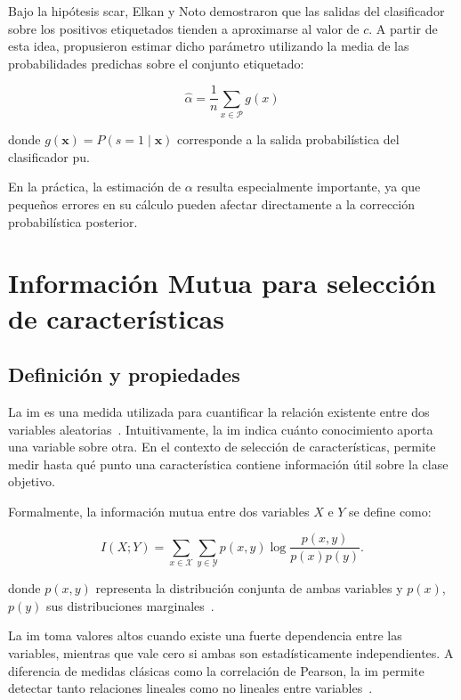 Bajo la hipótesis \acrshort{scar}, Elkan y Noto demostraron que las salidas del clasificador sobre los positivos etiquetados tienden a aproximarse al valor de $c$. A partir de esta idea, propusieron estimar dicho parámetro utilizando la media de las probabilidades predichas sobre el conjunto etiquetado:

\[
\hat{\alpha}
=
\frac{1}{n}
\sum_{x \in \mathcal{P}} g(x)
\]

donde $g(\mathbf{x}) = P(s=1 \mid \mathbf{x})$ corresponde a la salida probabilística del clasificador \acrshort{pu}.

En la práctica, la estimación de $\alpha$ resulta especialmente importante, ya que pequeños errores en su cálculo pueden afectar directamente a la corrección probabilística posterior.

\section{Información Mutua para selección de características}
\label{sec:info_mutua}

\subsection{Definición y propiedades}
\label{subsec:definicion_mi}

La \acrfull{im} es una medida utilizada para cuantificar la relación existente entre dos variables aleatorias~\cite{cover2006elements}. Intuitivamente, la \acrshort{im} indica cuánto conocimiento aporta una variable sobre otra. En el contexto de selección de características, permite medir hasta qué punto una característica contiene información útil sobre la clase objetivo.

Formalmente, la información mutua entre dos variables $X$ e $Y$ se define como:

\begin{equation}
I(X;Y)=
\sum_{x \in \mathcal{X}}
\sum_{y \in \mathcal{Y}}
p(x,y)\log\frac{p(x,y)}{p(x)p(y)}.
\label{eq:mi}
\end{equation}

donde $p(x,y)$ representa la distribución conjunta de ambas variables y $p(x)$, $p(y)$ sus distribuciones marginales~\cite{cover2006elements}.

La \acrshort{im} toma valores altos cuando existe una fuerte dependencia entre las variables, mientras que vale cero si ambas son estadísticamente independientes. A diferencia de medidas clásicas como la correlación de Pearson, la \acrshort{im} permite detectar tanto relaciones lineales como no lineales entre variables~\cite{peng2005feature}.

